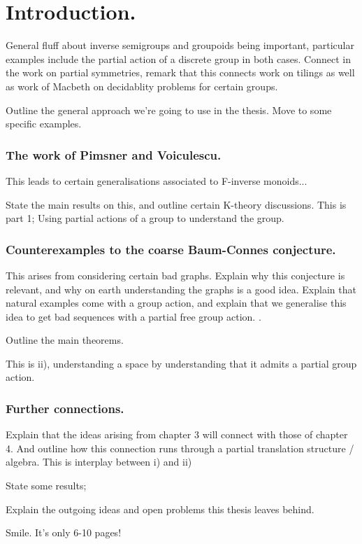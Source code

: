 \chapter{Introduction.}

General fluff about inverse semigroups and groupoids being important, particular examples include the partial action of a discrete group in both cases. Connect in the work on partial symmetries, remark that this connects work on tilings as well as work of Macbeth on decidablity problems for certain groups.

Outline the general approach we're going to use in the thesis. Move to some specific examples.

\subsection{The work of Pimsner and Voiculescu.}

This leads to certain generalisations associated to F-inverse monoids...

State the main results on this, and outline certain K-theory discussions. This is part 1; Using partial actions of a group to understand the group.

\subsection{Counterexamples to the coarse Baum-Connes conjecture.}

This arises from considering certain bad graphs. Explain why this conjecture is relevant, and why on earth understanding the graphs is a good idea. Explain that natural examples come with a group action, and explain that we generalise this idea to get bad sequences with a partial free group action. .

Outline the main theorems.

This is ii), understanding a space by understanding that it admits a partial group action.

\subsection{Further connections.}

Explain that the ideas arising from chapter 3 will connect with those of chapter 4. And outline how this connection runs through a partial translation structure / algebra. This is interplay between i) and ii)

State some results;

Explain the outgoing ideas and open problems this thesis leaves behind.

Smile. It's only 6-10 pages!

